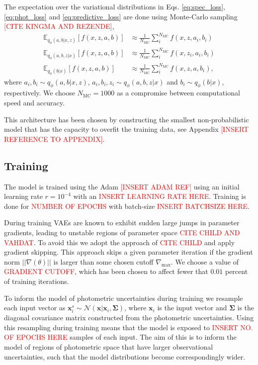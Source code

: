 The expectation over the variational distributions in Eqs. \ref{eq:spec_loss}, \ref{eq:phot_loss} and \ref{eq:predictive_loss} are done using Monte-Carlo sampling \textcolor{red}{[CITE KINGMA AND REZENDE]},
\begin{align}
    \mathbb{E}_{q_\phi(a,b|x,z)}\left[f(x,z,a,b)\right] &\approx \frac{1}{N_{\text{MC}}} \sum_i^{N_{\text{MC}}} f(x,z,a_i,b_i) \\
    \mathbb{E}_{q_\phi(a,b,z|x)}\left[f(x,z,a,b)\right] &\approx \frac{1}{N_{\text{MC}}} \sum_i^{N_{\text{MC}}} f(x,z_i,a_i,b_i) \\
    \mathbb{E}_{q_\phi(b|x)}\left[f(x,z,a,b)\right] &\approx \frac{1}{N_{\text{MC}}} \sum_i^{N_{\text{MC}}} f(x,z,a,b_i),
\end{align}
where $a_i, b_i \sim q_\phi(a,b|x,z)$, $a_i, b_i, z_i \sim q_\phi(a,b,z|x)$ and $b_i \sim q_\phi(b|x)$, respectively. We choose $N_{\text{MC}} = 1000$ as a compromise between computational speed and accuracy. 

This architecture has been chosen by constructing the smallest non-probabilistic model that has the capacity to overfit the training data, see Appendix \textcolor{red}{[INSERT REFERENCE TO APPENDIX]}.

\subsection{Training}
\label{subsec:training}

The model is trained using the Adam \textcolor{red}{[INSERT ADAM REF]} using an initial learning rate $r=10^{-4}$ with an \textcolor{red}{INSERT LEARNING RATE HERE}. Training is done for \textcolor{red}{NUMBER OF EPOCHS} with batch-size \textcolor{red}{INSERT BATCHSIZE HERE}. 

During training VAEs are known to exhibit sudden large jumps in parameter gradients, leading to unstable regions of parameter space \textcolor{red}{CITE CHILD AND VAHDAT}. To avoid this we adopt the approach of \textcolor{red}{CITE CHILD} and apply gradient skipping. This approach skips a given parameter iteration if the gradient norm $||\nabla(\theta)||$ is larger than some chosen cutoff $\nabla_\text{max}$. We choose a value of \textcolor{red}{GRADIENT CUTOFF}, which has been chosen to affect fewer that $0.01$ percent of training iterations.

To inform the model of photometric uncertainties during training we resample each input vector as $\mathbf{x}_i^s \sim \mathcal{N}(\mathbf{x}|\mathbf{x}_i, \boldsymbol{\Sigma})$, where $\mathbf{x}_i$ is the input vector and $\boldsymbol{\Sigma}$ is the diagonal covariance matrix constructed from the photometric uncertainties. Using this resampling during training means that the model is exposed to \textcolor{red}{INSERT NO. OF EPOCHS HERE} samples of each input. The aim of this is to inform the model of regions of photometric space that have larger observational uncertainties, such that the model distributions become correspondingly wider.

